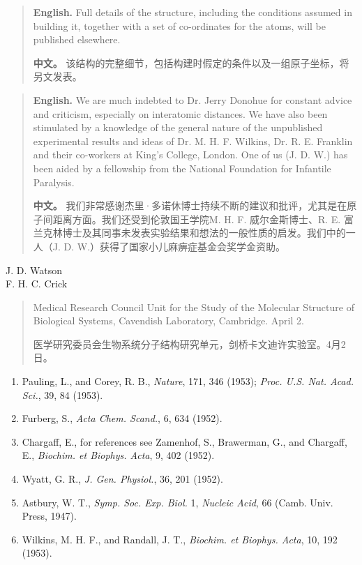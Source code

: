 \begin{quote}
\noindent\textbf{English.} Full details of the structure, including the conditions assumed in building it, together with a set of co-ordinates for the atoms, will be published elsewhere.

\smallskip
\noindent\textbf{中文。} 该结构的完整细节，包括构建时假定的条件以及一组原子坐标，将另文发表。
\end{quote}

\begin{quote}
\noindent\textbf{English.} We are much indebted to Dr. Jerry Donohue for constant advice and criticism, especially on interatomic distances. We have also been stimulated by a knowledge of the general nature of the unpublished experimental results and ideas of Dr. M. H. F. Wilkins, Dr. R. E. Franklin and their co-workers at King's College, London. One of us (J. D. W.) has been aided by a fellowship from the National Foundation for Infantile Paralysis.

\smallskip
\noindent\textbf{中文。} 我们非常感谢杰里·多诺休博士持续不断的建议和批评，尤其是在原子间距离方面。我们还受到伦敦国王学院M. H. F. 威尔金斯博士、R. E. 富兰克林博士及其同事未发表实验结果和想法的一般性质的启发。我们中的一人（J. D. W.）获得了国家小儿麻痹症基金会奖学金资助。
\end{quote}

\begin{flushright}
J. D. Watson\\
F. H. C. Crick
\end{flushright}

\begin{quote}
\noindent Medical Research Council Unit for the Study of the Molecular Structure of Biological Systems, Cavendish Laboratory, Cambridge. April 2.

\smallskip
\noindent 医学研究委员会生物系统分子结构研究单元，剑桥卡文迪许实验室。4月2日。
\end{quote}

\begin{enumerate}
\item Pauling, L., and Corey, R. B., \emph{Nature}, 171, 346 (1953); \emph{Proc. U.S. Nat. Acad. Sci.}, 39, 84 (1953).
\item Furberg, S., \emph{Acta Chem. Scand.}, 6, 634 (1952).
\item Chargaff, E., for references see Zamenhof, S., Brawerman, G., and Chargaff, E., \emph{Biochim. et Biophys. Acta}, 9, 402 (1952).
\item Wyatt, G. R., \emph{J. Gen. Physiol.}, 36, 201 (1952).
\item Astbury, W. T., \emph{Symp. Soc. Exp. Biol.} 1, \emph{Nucleic Acid}, 66 (Camb. Univ. Press, 1947).
\item Wilkins, M. H. F., and Randall, J. T., \emph{Biochim. et Biophys. Acta}, 10, 192 (1953).
\end{enumerate}

